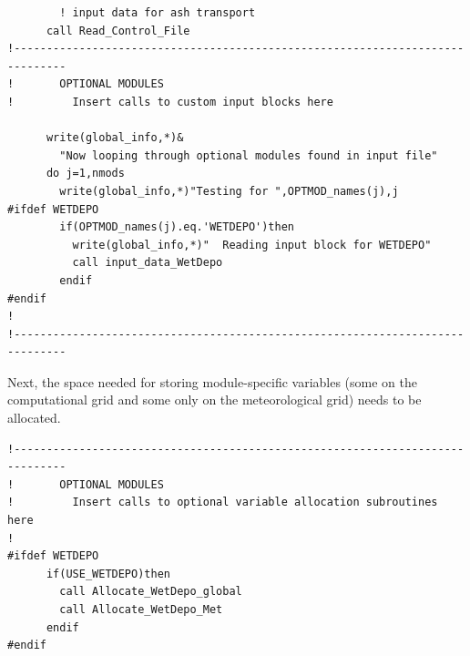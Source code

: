 \small
\begin{verbatim}
        ! input data for ash transport
      call Read_Control_File
!------------------------------------------------------------------------------
!       OPTIONAL MODULES
!         Insert calls to custom input blocks here

      write(global_info,*)&
        "Now looping through optional modules found in input file"
      do j=1,nmods
        write(global_info,*)"Testing for ",OPTMOD_names(j),j
#ifdef WETDEPO
        if(OPTMOD_names(j).eq.'WETDEPO')then
          write(global_info,*)"  Reading input block for WETDEPO"
          call input_data_WetDepo
        endif
#endif
!
!------------------------------------------------------------------------------
\end{verbatim}
\normalsize





Next, the space needed for storing module-specific variables (some on the 
computational grid and some only on the meteorological grid) needs to be
allocated.  
\small
\begin{verbatim}
!------------------------------------------------------------------------------
!       OPTIONAL MODULES
!         Insert calls to optional variable allocation subroutines here
!
#ifdef WETDEPO
      if(USE_WETDEPO)then
        call Allocate_WetDepo_global
        call Allocate_WetDepo_Met
      endif
#endif
\end{verbatim}
\normalsize

